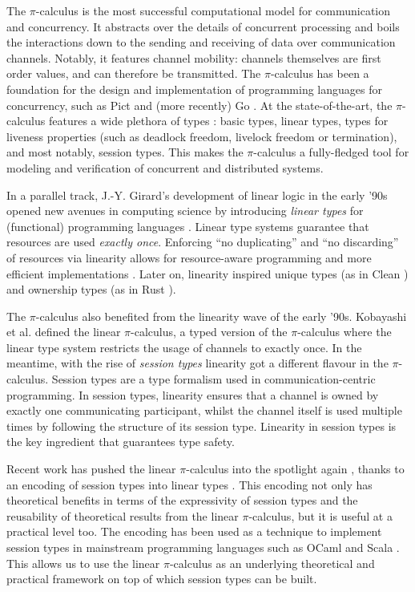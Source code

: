 \documentclass[a4paper,UKenglish,cleveref,autoref,thm-restate,authorcolumns]{lipics-v2019}
\theoremstyle{definition}
\newcommand{\picalc}{$\pi$-calculus}
\begin{document}
The \picalc{} \cite{MilnerPW92,Milner99} is the most successful computational model for communication and concurrency.
It abstracts over the details of concurrent processing and boils the interactions down to the sending and receiving of data over communication channels.
Notably, it features channel mobility: channels themselves are first order values, and can therefore be transmitted.
The \picalc{} has been a foundation for the design and implementation of programming languages for concurrency, such as Pict \cite{Pierce} and (more recently) Go \cite{Golang}.
At the state-of-the-art, the \picalc{} features a wide plethora of types \cite{K07}: basic types, linear types, types for liveness properties (such as deadlock freedom, livelock freedom or termination), and most notably, session types. This makes the \picalc{} a fully-fledged tool for modeling and verification of concurrent and distributed systems.

In a parallel track, J.-Y. Girard's development of linear logic \cite{Girard87} in the early '90s opened new avenues in computing science by introducing \emph{linear types} for (functional) programming languages \cite{Curry-Howard,Wadler90,Bernardy2018}.
Linear type systems guarantee that resources are used \emph{exactly once}.
Enforcing ``no duplicating'' and ``no discarding'' of resources via linearity allows for resource-aware programming and more efficient implementations \cite{Wadler90}.
Later on, linearity inspired unique types (as in Clean \cite{BarendsenS96}) and ownership types (as in Rust \cite{MatsakisK14}).

The \picalc{} also benefited from the linearity wave of the early '90s.
Kobayashi et al. \cite{KPT96} defined the {linear} \picalc{}, a typed version of the \picalc{} where the linear type system restricts the usage of channels to exactly once.
%
In the meantime, with the rise of \emph{session types} \cite{H93,THK94,HVK98} linearity got a different flavour in the \picalc{}.
Session types are a type formalism used in communication-centric programming.
In session types, linearity ensures that a channel is owned by exactly one communicating participant, whilst the channel itself is used multiple times by following the structure of its session type.
Linearity in session types is the key ingredient that guarantees type safety.

Recent work has pushed the linear \picalc{} into the spotlight again \cite{KPT96}, thanks to an encoding of session types into linear types \cite{DardhaGS12,Dardha14,DardhaGS17}.
This encoding not only has theoretical benefits in terms of the expressivity of session types and the reusability of theoretical results from the linear \picalc{}, but it is useful at a practical level too.
The encoding has been used as a technique to implement session types in mainstream programming languages such as OCaml \cite{Padovani17} and Scala \cite{ScalasY16,ScalasDHY17}.
This allows us to use the linear \picalc{} as an underlying theoretical and practical framework on top of which session types can be built.
\end{document}
